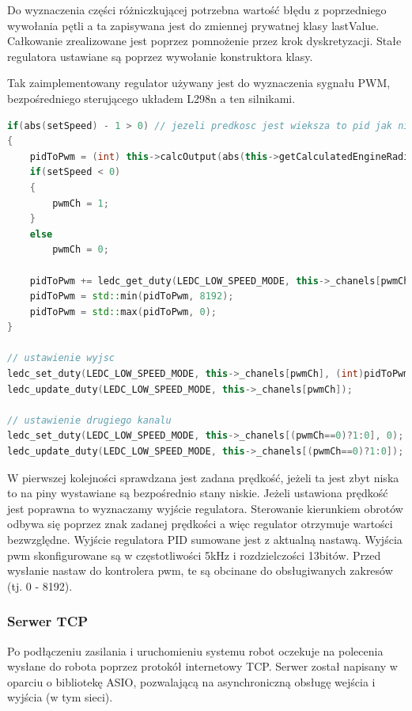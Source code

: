 Do wyznaczenia części różniczkującej potrzebna wartość błędu z poprzedniego wywołania pętli a ta zapisywana jest do zmiennej prywatnej klasy lastValue. 
Całkowanie zrealizowane jest poprzez pomnożenie przez krok dyskretyzacji. Stałe regulatora ustawiane są poprzez wywołanie konstruktora klasy.

Tak zaimplementowany regulator używany jest do wyznaczenia sygnału PWM, bezpośredniego sterującego układem L298n a ten silnikami. 

\begin{lstlisting}[language=C++,caption=Wyznaczenie modulacji PWM,label={kodCPPPWM}]
if(abs(setSpeed) - 1 > 0) // jezeli predkosc jest wieksza to pid jak nie to hamulec bo pwm=0
{
	pidToPwm = (int) this->calcOutput(abs(this->getCalculatedEngineRadialSpeed()), abs(setSpeed));
	if(setSpeed < 0)
	{
		pwmCh = 1;
	}
	else
		pwmCh = 0;

	pidToPwm += ledc_get_duty(LEDC_LOW_SPEED_MODE, this->_chanels[pwmCh]);
	pidToPwm = std::min(pidToPwm, 8192);
	pidToPwm = std::max(pidToPwm, 0);
}

// ustawienie wyjsc
ledc_set_duty(LEDC_LOW_SPEED_MODE, this->_chanels[pwmCh], (int)pidToPwm);
ledc_update_duty(LEDC_LOW_SPEED_MODE, this->_chanels[pwmCh]);

// ustawienie drugiego kanalu
ledc_set_duty(LEDC_LOW_SPEED_MODE, this->_chanels[(pwmCh==0)?1:0], 0);
ledc_update_duty(LEDC_LOW_SPEED_MODE, this->_chanels[(pwmCh==0)?1:0]);
\end{lstlisting}

W pierwszej kolejności sprawdzana jest zadana prędkość, jeżeli ta jest zbyt niska to na piny wystawiane są bezpośrednio stany niskie.
Jeżeli ustawiona prędkość jest poprawna to wyznaczamy wyjście regulatora. Sterowanie kierunkiem obrotów odbywa 
się poprzez znak zadanej prędkości a więc regulator otrzymuje wartości bezwzględne. 
Wyjście regulatora PID sumowane jest z aktualną nastawą. Wyjścia pwm skonfigurowane są w częstotliwości 5kHz i rozdzielczości 13bitów. 
Przed wysłanie nastaw do kontrolera pwm, te są obcinane do obsługiwanych zakresów (tj. 0 - 8192).

\subsubsection{Serwer TCP}

Po podłączeniu zasilania i uruchomieniu
systemu robot oczekuje na polecenia wysłane do robota poprzez protokół internetowy TCP.
Serwer został napisany w oparciu o bibliotekę ASIO, pozwalającą na asynchroniczną obsługę wejścia i wyjścia (w tym sieci).

